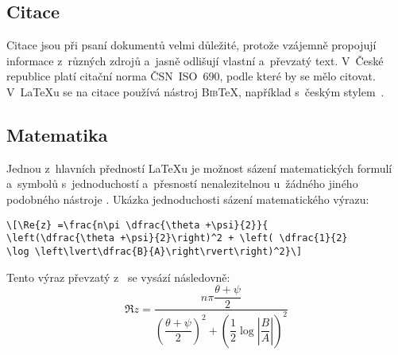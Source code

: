 \documentclass[11pt]{article}
\begin{document}
\subsection{Citace}
Citace jsou při psaní dokumentů velmi důležité, protože vzájemně propojují informace z~různých zdrojů a~jasně odlišují vlastní a~převzatý text.
V~České republice platí citační norma ČSN~ISO~690, podle které by se mělo citovat.
V~\LaTeX u se na citace používá nástroj \textsc{Bib}\TeX , například s~českým stylem~\cite{Pysny:2009}.

\subsection{Matematika}
Jednou z~hlavních předností \LaTeX u je možnost sázení matematických formulí a~symbolů s~jednoduchostí a~přesností nenalezitelnou u~žádného jiného podobného nástroje \cite{Wyrwolova:2014}.
Ukázka jednoduchosti sázení matematického výrazu:
\bigskip

\noindent\verb|\[\Re{z} =\frac{n\pi \dfrac{\theta +\psi}{2}}{|\\
\verb|\left(\dfrac{\theta +\psi}{2}\right)^2 + \left( \dfrac{1}{2}|\\
\verb|\log \left\lvert\dfrac{B}{A}\right\rvert\right)^2}\]|
\bigskip

\noindent Tento výraz převzatý z~\cite{Downes:2002} se vysází následovně:
\[\Re{z} =\frac{n\pi \dfrac{\theta +\psi}{2}}{
\left(\dfrac{\theta +\psi}{2}\right)^2 + \left( \dfrac{1}{2}
\log \left\lvert\dfrac{B}{A}\right\rvert\right)^2}\]

\newpage


\end{document}
